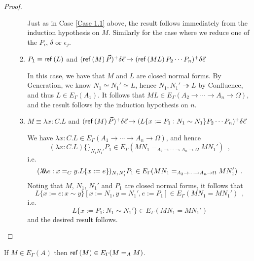 \begin{proof}
\begin{enumerate}
\begin{enumerate}
Just as in Case \ref{Case 1.1} above, the result follows immediately from the induction hypothesis on $M$.  Similarly for the case where we reduce one of the $P_i$, $\delta$ or $\epsilon_j$.
\item
$P_1 \equiv \mathsf{ref} \left( {L} \right)$ and $(\mathsf{ref} \left( {M} \right) \vec{P})^+ \delta \vec{\epsilon} \rightarrow (\mathsf{ref} \left( {M L} \right) P_2 \cdots P_n)^+ \delta \vec{\epsilon}$

In this case, we have that $M$ and $L$ are closed normal forms.  By Generation, we know $N_1 \simeq N_1' \simeq L$, hence $N_1, N_1' \twoheadrightarrow L$
by Confluence, and thus $L \in E_\Gamma(A_1)$.  It follows that $ML \in E_\Gamma(A_2 \rightarrow \cdots \rightarrow A_n \rightarrow \Omega)$, and
the result follows by the induction hypothesis on $n$.
\item
$M \equiv \lambda x:C.L$ and $(\mathsf{ref} \left( {M} \right) \vec{P})^+ \delta \vec{\epsilon} \rightarrow (L \{ x := P_1 : N_1 \sim N_1 \} P_2 \cdots P_n)^+ \delta \vec{\epsilon}$

We have $\lambda x:C.L \in E_\Gamma(A_1 \rightarrow \cdots \rightarrow A_n \rightarrow \Omega)$, and hence
\[ (\lambda x:C.L)\{\}_{N_1 N_1'} P_1 \in E_\Gamma(M N_1 =_{A_2 \rightarrow \cdots \rightarrow A_n \rightarrow \Omega} M N_1') \enspace , \]
i.e.
\[ (\lambda \!\! \lambda \!\! \lambda e : x =_C y. L \{ x := e \})_{N_1 N_1'} P_1 \in E_\Gamma(M N_1 =_{A_2 \rightarrow \cdots \rightarrow A_n \rightarrow \Omega} M N_1') \enspace . \]
Noting that $M$, $N_1$, $N_1'$ and $P_1$ are closed normal forms, it follows that
\[ L \{ x:= e : x \sim y \} [ x := N_1, y = N_1', e := P_1 ] \in E_\Gamma(M N_1 = M N_1') \enspace , \]
i.e.
\[ L \{ x := P_1 : N_1 \sim N_1' \} \in E_\Gamma(M N_1 = M N_1') \]
and the desired result follows.
\end{enumerate}
\end{enumerate}
\end{proof}

\begin{lm}
\label{lm:Eref}
If $M \in E_\Gamma(A)$ then $\mathsf{ref} \left( {M} \right) \in E_\Gamma(M =_A M)$.
\end{lm}

